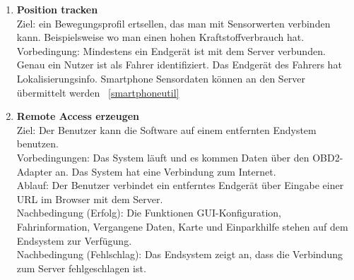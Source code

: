 \documentclass[pflichtenheft.tex]{subfiles}
\begin{document}
\begin{enumerate}
		\item{\textbf{Position tracken}} \\Ziel: ein Bewegungsprofil ertsellen, das man mit Sensorwerten verbinden kann. Beispielsweise wo man einen hohen Kraftstoffverbrauch hat. \\Vorbedingung: Mindestens ein Endgerät ist mit dem Server verbunden. Genau ein Nutzer ist als Fahrer identifiziert. Das Endgerät des Fahrers hat Lokalisierungsinfo. Smartphone Sensordaten können an den Server übermittelt werden ~\ref{smartphoneutil}

		
		\item{\textbf{Remote Access erzeugen}} \\ Ziel: Der Benutzer kann die Software auf einem entfernten Endystem benutzen.\\ Vorbedingungen: Das System läuft und es kommen Daten über den OBD2-Adapter an. Das System hat eine Verbindung zum Internet. \\ Ablauf: Der Benutzer verbindet ein entferntes Endgerät über Eingabe einer URL im Browser mit dem Server.\\ Nachbedingung (Erfolg): Die Funktionen GUI-Konfiguration, Fahrinformation, Vergangene Daten, Karte und Einparkhilfe stehen auf dem Endsystem zur Verfügung. \\ Nachbedingung (Fehlschlag): Das Endsystem zeigt an, dass die Verbindung zum Server fehlgeschlagen ist.
		\setcounter{enumTemp}{\value{enumi}}
	\end{enumerate} 
\end{document}
